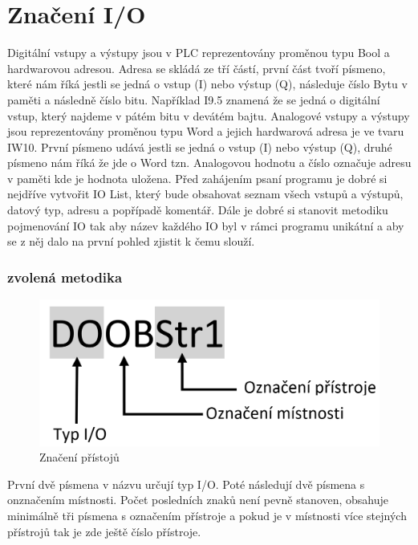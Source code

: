\documentclass[a4paper,12pt,czech,bibliography=totoc]{scrbook}
\begin{document}
\section{Značení I/O}

	Digitální vstupy a výstupy jsou v PLC reprezentovány proměnou typu Bool a hardwarovou adresou. Adresa se skládá ze tří částí, první část tvoří písmeno, které nám říká jestli se jedná o vstup (I) nebo výstup (Q), následuje číslo Bytu v paměti a následně číslo bitu. Například I9.5 znamená že se jedná o digitální vstup, který najdeme v pátém bitu v devátém bajtu.
	\newline
	Analogové vstupy a výstupy jsou reprezentovány proměnou typu Word a jejich hardwarová adresa je ve tvaru IW10. První písmeno udává jestli se jedná o vstup (I) nebo výstup (Q), druhé písmeno nám říká že jde o Word tzn. Analogovou hodnotu a číslo označuje adresu v paměti kde je hodnota uložena.
	\newline	
	Před zahájením psaní programu je dobré si nejdříve vytvořit IO List, který bude obsahovat seznam všech vstupů a výstupů, datový typ, adresu a popřípadě komentář. Dále je dobré si stanovit metodiku pojmenování IO tak aby název každého IO byl v rámci programu unikátní a aby se z něj dalo na první pohled zjistit k čemu slouží.

\subsubsection{zvolená metodika}
\begin{figure}[h]
	\centering
	\includegraphics[scale = 0.3]{tagname.PNG}
	\caption{Značení přístojů}
	\label{fig:my_label}
\end{figure}

První dvě písmena v názvu určují typ I/O. Poté následují dvě písmena s onznačením místnosti. Počet posledních znaků není pevně stanoven, obsahuje minimálně tři písmena s označením přístroje a pokud je v místnosti více stejných přístrojů tak je zde ještě číslo přístroje.
	
\end{document}
